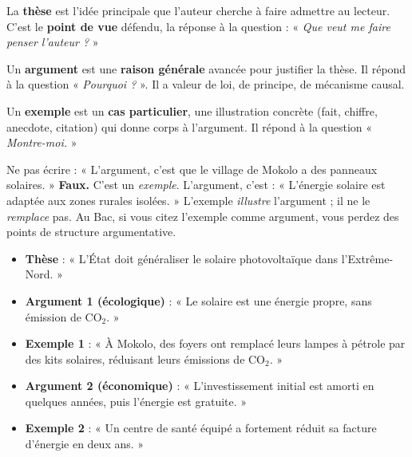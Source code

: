 \documentclass[11pt]{article}
\newcommand{\cle}[1]{{\popxbold\color{popdark}#1}}
\begin{document}
\begin{definition}[Thèse]
La \textbf{thèse} est l'idée principale que l'auteur cherche à faire admettre au lecteur. C'est le \textbf{point de vue} défendu, la réponse à la question : « \emph{Que veut me faire penser l'auteur ?} »
\end{definition}

\begin{definition}[Argument]
Un \textbf{argument} est une \textbf{raison générale} avancée pour justifier la thèse. Il répond à la question « \emph{Pourquoi ?} ». Il a valeur de loi, de principe, de mécanisme causal.
\end{definition}

\begin{definition}[Exemple]
Un \textbf{exemple} est un \textbf{cas particulier}, une illustration concrète (fait, chiffre, anecdote, citation) qui donne corps à l'argument. Il répond à la question « \emph{Montre-moi.} »
\end{definition}

\begin{attention}
Ne pas écrire : « L'argument, c'est que le village de Mokolo a des panneaux solaires. » \textbf{Faux.} C'est un \emph{exemple}.
L'argument, c'est : « L'énergie solaire est adaptée aux zones rurales isolées. »
L'exemple \emph{illustre} l'argument ; il ne le \emph{remplace} pas. Au Bac, si vous citez l'exemple comme argument, vous perdez des points de \cle{structure argumentative}.
\end{attention}

\begin{exemplebox}
\begin{itemize}
    \item \textbf{Thèse} : « L'État doit généraliser le solaire photovoltaïque dans l'Extrême-Nord. »
    \item \textbf{Argument 1 (écologique)} : « Le solaire est une énergie propre, sans émission de CO$_2$. »
    \item \textbf{Exemple 1} : « À Mokolo, des foyers ont remplacé leurs lampes à pétrole par des kits solaires, réduisant leurs émissions de CO$_2$. »
    \item \textbf{Argument 2 (économique)} : « L'investissement initial est amorti en quelques années, puis l'énergie est gratuite. »
    \item \textbf{Exemple 2} : « Un centre de santé équipé a fortement réduit sa facture d'énergie en deux ans. »
\end{itemize}
\end{exemplebox}
\end{document}
